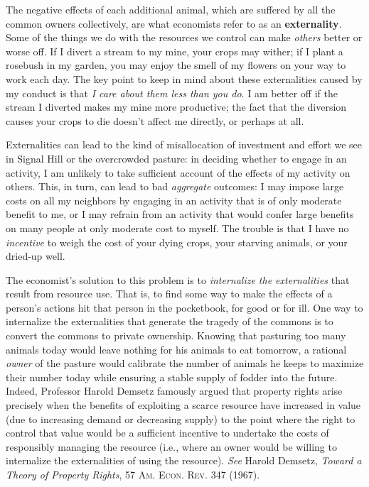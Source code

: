The negative effects of each additional animal, which are suffered by all the
common owners collectively, are what economists refer to as an
\textbf{externality}. Some of the things we do with the resources we control can
make \textit{others} better or worse off. If I divert a stream to my mine, your
crops may wither; if I plant a rosebush in my garden, you may enjoy the smell of
my flowers on your way to work each day. The key point to keep in mind about
these externalities caused by my conduct is that \textit{I care about them less
than you do}. I am better off if the stream I diverted makes my mine more
productive; the fact that the diversion causes your crops to die doesn't affect
me directly, or perhaps at all.

Externalities can lead to the kind of misallocation of investment and effort we
see in Signal Hill or the overcrowded pasture: in deciding whether to engage in
an activity, I am unlikely to take sufficient account of the effects of my
activity on others. This, in turn, can lead to bad \textit{aggregate} outcomes:
I may impose large costs on all my neighbors by engaging in an activity that is
of only moderate benefit to me, or I may refrain from an activity that would
confer large benefits on many people at only moderate cost to myself. The
trouble is that I have no \textit{incentive} to weigh the cost of your dying
crops, your starving animals, or your dried-up well.

The economist's solution to this problem is to \textit{internalize the
externalities} that result from resource use. That is, to find some way to make
the effects of a person's actions hit that person in the pocketbook, for good or
for ill. One way to internalize the externalities that generate the tragedy of
the commons is to convert the commons to private ownership. Knowing that
pasturing too many animals today would leave nothing for his animals to eat
tomorrow, a rational \textit{owner} of the pasture would calibrate the number of
animals he keeps to maximize their number today while ensuring a stable supply
of fodder into the future. Indeed, Professor Harold Demsetz famously argued that
property rights arise precisely when the benefits of exploiting a scarce
resource have increased in value (due to increasing demand or decreasing supply)
to the point where the right to control that value would be a sufficient
incentive to undertake the costs of responsibly managing the resource (i.e.,
where an owner would be willing to internalize the externalities of using the
resource). \textit{See} Harold Demsetz, \textit{Toward a Theory of Property
Rights}, 57 \textsc{Am. Econ. Rev}. 347 (1967).

